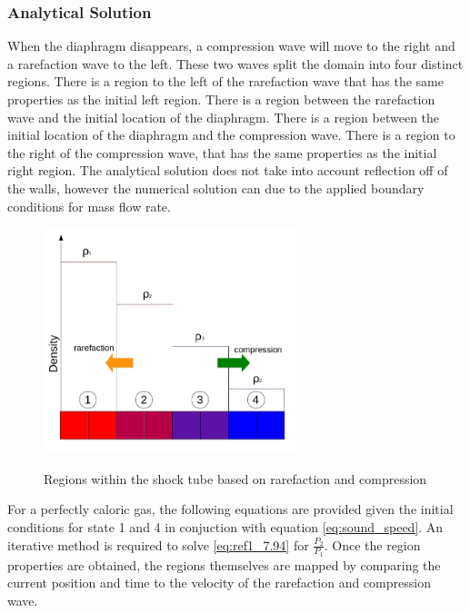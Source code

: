     \subsubsection{Analytical Solution}
    
    When the diaphragm disappears, a compression wave will move to the right and a
    rarefaction wave to the left. These two waves split the domain into four
    distinct regions. There is a region to the left of the rarefaction wave that has
    the same properties as the initial left region. There is a region between the
    rarefaction wave and the initial location of the diaphragm. There is a region
    between the initial location of the diaphragm and the compression wave. There is
    a region to the right of the compression wave, that has the same properties
    as the initial right region. The analytical solution does not take into
    account reflection off of the walls, however the numerical solution can due
    to the applied boundary conditions for mass flow rate.
    
    \begin{figure}[!h]
    	\centering
    	\includegraphics[width=0.65\textwidth]{images/Shock_Tube/Shock_Tube_regions}
    	\label{fig:V2_pressure_scaling}
    	\caption{Regions within the shock tube based on rarefaction and compression}
    \end{figure}
    
    For a perfectly caloric gas, the following equations are provided
    \cite[p. 238]{McGraw-Hill} given the initial conditions for state 1 and
    4 in conjuction with equation \ref{eq:sound_speed}. An iterative method is required
    to solve \ref{eq:ref1_7.94} for $\frac{P_{2}}{P_{1}}$. Once the region
    properties are obtained, the regions themselves are mapped by comparing the
    current position and time to the velocity of the rarefaction and compression
    wave. 
    
